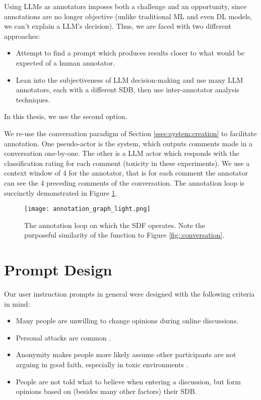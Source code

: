 Using LLMs as annotators imposes both a challenge and an opportunity, since annotations are no longer objective (unlike traditional ML and even DL models, we can't explain a LLM's decision). Thus, we are faced with two different approaches:

\begin{itemize}
	\item Attempt to find a prompt which produces results closer to what would be expected of a human annotator.
	\item Lean into the subjectiveness of LLM decision-making and use many LLM annotators, each with a different SDB, then use inter-annotator analysis techniques.
\end{itemize}

In this thesis, we use the second option.

We re-use the conversation paradigm of Section \ref{ssec:system:creation} to facilitate annotation. One pseudo-actor is the system, which outputs comments made in a conversation one-by-one. The other is a LLM actor which responds with the classification rating for each comment (toxicity in these experiments).  We use a context window of 4 for the annotator, that is for each comment the annotator can see the 4 preceding comments of the conversation. The annotation loop is succinctly demonstrated in Figure \ref{fig::annotation}.

\begin{figure}
	\centering
	\texttt{[image: annotation\_graph\_light.png]}
	\caption{The annotation loop on which the SDF operates. Note the purposeful similarity of the function to Figure \ref{fig::conversation}.}
	\label{fig::annotation}
\end{figure}


\section{Prompt Design}
\label{sec:system:design-prompt}

Our user instruction prompts in general were designed with the following criteria in mind:

\begin{itemize}
	\item Many people are unwilling to change opinions during online discussions.
	
	\item Personal attacks are common \cite{dekock2022disagree}.
	
	\item Anonymity makes people more likely assume other participants are not arguing in good faith, especially in toxic environments \cite{Avalle2024PersistentIP}.
	
	\item People are not told what to believe when entering a discussion, but form opinions based on (besides many other factors) their SDB.  %
	
\end{itemize}

